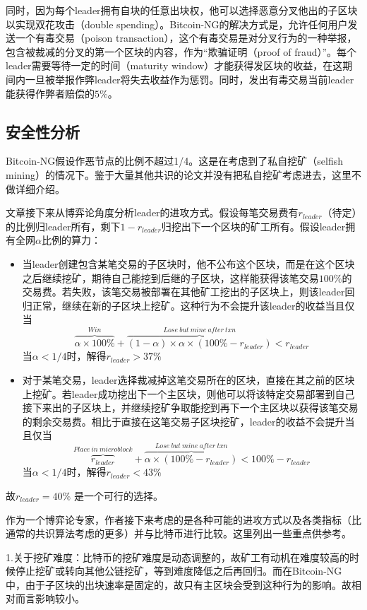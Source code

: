 同时，因为每个leader拥有自块的任意出块权，他可以选择恶意分叉他出的子区块以实现双花攻击（double spending）。Bitcoin-NG的解决方式是，允许任何用户发送一个有毒交易（poison transaction），这个有毒交易是对分叉行为的一种举报，包含被裁减的分叉的第一个区块的内容，作为“欺骗证明（proof of fraud）”。每个leader需要等待一定的时间（maturity window）才能获得发区块的收益，在这期间内一旦被举报作弊leader将失去收益作为惩罚。同时，发出有毒交易当前leader能获得作弊者赔偿的$5\%$。

\subsection{安全性分析}
Bitcoin-NG假设作恶节点的比例不超过1/4。这是在考虑到了私自挖矿（selfish mining）的情况下。鉴于大量其他共识的论文并没有把私自挖矿考虑进去，这里不做详细介绍。

文章接下来从博弈论角度分析leader的进攻方式。假设每笔交易费有$r_{leader}$（待定）的比例归leader所有，剩下$1-r_{leader}$归挖出下一个区块的矿工所有。假设leader拥有全网$\alpha$比例的算力：
\begin{itemize}
	\item 当leader创建包含某笔交易的子区块时，他不公布这个区块，而是在这个区块之后继续挖矿，期待自己能挖到后继的子区块，这样能获得该笔交易$100\%$的交易费。若失败，该笔交易被部署在其他矿工挖出的子区块上，则该leader回归正常，继续在新的子区块上挖矿。这种行为不会提升该leader的收益当且仅当
	$$ \overbrace{\alpha\times 100\%}^{Win}+\overbrace{(1-\alpha)\times\alpha \times ( 100\%-r_{leader})}^{Lose~but~mine~after~txn}<r_{leader}$$
	当$\alpha<1/4$时，解得$r_{leader} >37\%$
	
	\item 对于某笔交易，leader选择裁减掉这笔交易所在的区块，直接在其之前的区块上挖矿。若leader成功挖出下一个主区块，则他可以将该特定交易部署到自己接下来出的子区块上，并继续挖矿争取能挖到再下一个主区块以获得该笔交易的剩余交易费。相比于直接在这笔交易子区块挖矿，leader的收益不会提升当且仅当
	$$ \overbrace{r_{leader}}^{Place~in~microblock}+\overbrace{ \alpha \times ( 100\%-r_{leader})}^{Lose~but~mine~after~txn} < 100\%-r_{leader}$$
		当$\alpha<1/4$时，解得$r_{leader} < 43\%$
\end{itemize}
故$r_{leader} = 40\%$ 是一个可行的选择。

作为一个博弈论专家，作者接下来考虑的是各种可能的进攻方式以及各类指标（比通常的共识算法考虑的更多）并与比特币进行比较。这里列出一些重点供参考。

1.关于挖矿难度：比特币的挖矿难度是动态调整的，故矿工有动机在难度较高的时候停止挖矿或转向其他公链挖矿，等到难度降低之后再回归。而在Bitcoin-NG中，由于子区块的出块速率是固定的，故只有主区块会受到这种行为的影响。故相对而言影响较小。

